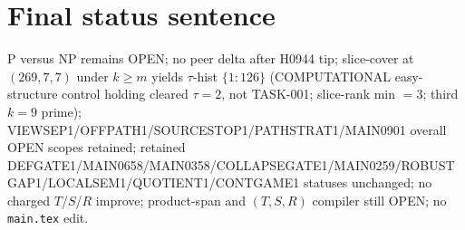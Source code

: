 \documentclass[11pt]{article}
\begin{document}
\section*{Final status sentence}
P versus NP remains OPEN; no peer delta after H0944 tip; slice-cover at $(269,7,7)$ under $k{\ge}m$ yields $\tau$-hist $\{1{:}126\}$ (COMPUTATIONAL easy-structure control holding cleared $\tau{=}2$, not TASK-001; slice-rank min $=3$; third $k{=}9$ prime); VIEWSEP1/OFFPATH1/SOURCESTOP1/PATHSTRAT1/MAIN0901 overall OPEN scopes retained; retained DEFGATE1/MAIN0658/MAIN0358/COLLAPSEGATE1/MAIN0259/ROBUSTGAP1/LOCALSEM1/QUOTIENT1/CONTGAME1 statuses unchanged; no charged $T$/$S$/$R$ improve; product-span and $(T,S,R)$ compiler still OPEN; no \texttt{main.tex} edit.
\end{document}
